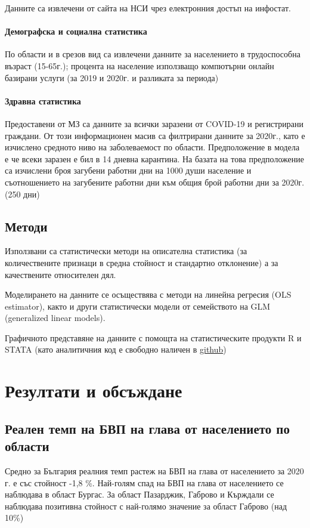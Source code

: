 \documentclass[a4paper,12pt]{article}
\begin{document}
Данните са извлечени от сайта на НСИ чрез електронния достъп на инфостат. 
\paragraph{Демографска и социална статистика}
По области и в срезов вид са извлечени данните за населението в трудоспособна възраст (15-65г.); процента на население използващо компютърни онлайн базирани услуги (за 2019 и 2020г. и разликата за периода)

\paragraph{Здравна статистика}
Предоставени от МЗ са данните за всички заразени от COVID-19 и регистрирани граждани. От този информационен масив са филтрирани данните за 2020г., като е изчислено средното ниво на заболеваемост по области. Предположение в модела е че всеки заразен е бил в 14 дневна карантина. На базата на това предположение са изчислени броя загубени работни дни на 1000 души население и съотношението на загубените работни дни към общия брой работни дни за 2020г. (250 дни)

\subsection{Методи}
Използвани са статистически методи на описателна статистика (за количествените признаци в средна стойност и стандартно отклонение) а за качествените относителен дял.

Моделирането на данните се осъществява с методи на линейна регресия (OLS estimator), както и други статистически модели от семейството на GLM (generalized linear models). 

Графичното представяне на данните с помощта на статистическите продукти R и STATA (като аналитичния код е свободно наличен в \href{https://github.com/kostadinoff/macroeconomics_SU_project.git}{github})
\section{Резултати и обсъждане}

\subsection{Реален темп на БВП на глава от населението по области}
Средно за България реалния темп растеж на БВП на глава от населението за 2020 г. е със стойност -1,8 \%. Най-голям спад на БВП на глава от населението се наблюдава в област Бургас. За област Пазарджик, Габрово и Кърждали се наблюдава позитивна стойност с най-голямо значение за област Габрово (над 10\%)
\end{document}
